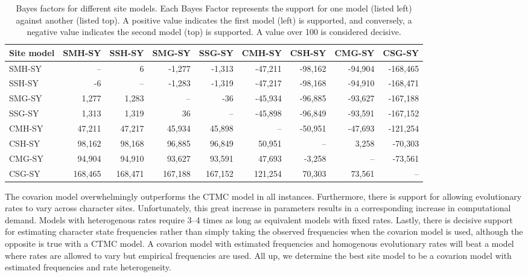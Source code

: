 \documentclass[]{article}
\begin{document}
\begin{table}

\caption{\label{tab:site-models}Bayes factors for different site models. Each Bayes Factor represents the support for one model (listed left) against another (listed top). A positive value indicates the first model (left) is supported, and conversely, a negative value indicates the second model (top) is supported. A value over 100 is considered decisive.}
\centering
\begin{tabular}[t]{lrrrrrrrr}
\toprule
Site model & SMH-SY & SSH-SY & SMG-SY & SSG-SY & CMH-SY & CSH-SY & CMG-SY & CSG-SY\\
\midrule
SMH-SY & -- & 6 & -1,277 & -1,313 & -47,211 & -98,162 & -94,904 & -168,465\\
SSH-SY & -6 & -- & -1,283 & -1,319 & -47,217 & -98,168 & -94,910 & -168,471\\
SMG-SY & 1,277 & 1,283 & -- & -36 & -45,934 & -96,885 & -93,627 & -167,188\\
SSG-SY & 1,313 & 1,319 & 36 & -- & -45,898 & -96,849 & -93,591 & -167,152\\
\addlinespace
CMH-SY & 47,211 & 47,217 & 45,934 & 45,898 & -- & -50,951 & -47,693 & -121,254\\
CSH-SY & 98,162 & 98,168 & 96,885 & 96,849 & 50,951 & -- & 3,258 & -70,303\\
CMG-SY & 94,904 & 94,910 & 93,627 & 93,591 & 47,693 & -3,258 & -- & -73,561\\
CSG-SY & 168,465 & 168,471 & 167,188 & 167,152 & 121,254 & 70,303 & 73,561 & --\\
\bottomrule
\end{tabular}
\end{table}

The covarion model overwhelmingly outperforms the CTMC model in all instances. Furthermore, there is support for allowing evolutionary rates to vary across character sites. Unfortunately, this great increase in parameters results in a corresponding increase in computational demand. Models with heterogenous rates require 3--4 times as long as equivalent models with fixed rates. Lastly, there is decisive support for estimating character state frequencies rather than simply taking the observed frequencies when the covarion model is used, although the opposite is true with a CTMC model. A covarion model with estimated frequencies and homogenous evolutionary rates will beat a model where rates are allowed to vary but empirical frequencies are used. All up, we determine the best site model to be a covarion model with estimated frequencies and rate heterogeneity.
\end{document}
